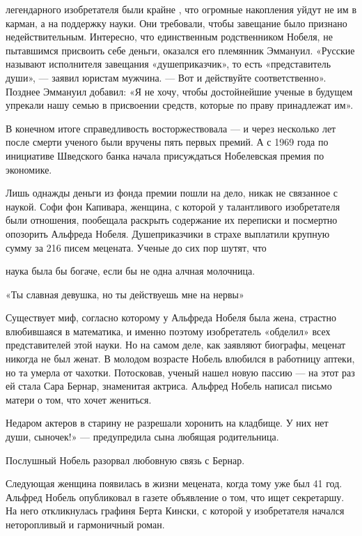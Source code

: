  легендарного изобретателя были крайне , что огромные накопления уйдут не им в карман, а на поддержку науки. Они требовали, чтобы завещание было признано недействительным. Интересно, что единственным родственником Нобеля, не пытавшимся присвоить себе деньги, оказался его племянник Эммануил. «Русские называют исполнителя завещания «душеприказчик», то есть «представитель души», — заявил юристам мужчина. — Вот и действуйте соответственно». Позднее Эммануил добавил: «Я не хочу, чтобы достойнейшие ученые в будущем упрекали нашу семью в присвоении средств, которые по праву принадлежат им».

В конечном итоге справедливость восторжествовала — и через несколько лет после смерти ученого были вручены пять первых премий. А с 1969 года по инициативе Шведского банка начала присуждаться Нобелевская премия по экономике.

Лишь однажды деньги из фонда премии пошли на дело, никак не связанное с наукой. Софи фон Капивара, женщина, с которой у талантливого изобретателя были отношения, пообещала раскрыть содержание их переписки и посмертно опозорить Альфреда Нобеля. Душеприказчики в страхе выплатили крупную сумму за 216 писем мецената. Ученые до сих пор шутят, что

\begin{fancyquotes}
    наука была бы богаче, если бы не одна алчная молочница.
\end{fancyquotes}

«Ты славная девушка, но ты действуешь мне на нервы»

Существует миф, согласно которому у Альфреда Нобеля была жена, страстно влюбившаяся в математика, и именно поэтому изобретатель «обделил» всех представителей этой науки. Но на самом деле, как заявляют биографы, меценат никогда не был женат. В молодом возрасте Нобель влюбился в работницу аптеки, но та умерла от чахотки. Потосковав, ученый нашел новую пассию — на этот раз ей стала Сара Бернар, знаменитая актриса. Альфред Нобель написал письмо матери о том, что хочет жениться.

\begin{fancyquotes}
    Недаром актеров в старину не разрешали хоронить на кладбище. У них нет души, сыночек!» — предупредила сына любящая родительница.
\end{fancyquotes}



Послушный Нобель разорвал любовную связь с Бернар.

Следующая женщина появилась в жизни мецената, когда тому уже был 41 год. Альфред Нобель опубликовал в газете объявление о том, что ищет секретаршу. На него откликнулась графиня Берта Кински, с которой у изобретателя начался неторопливый и гармоничный роман.

